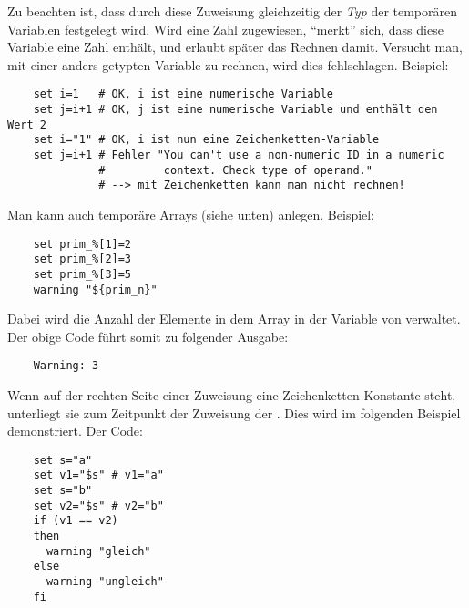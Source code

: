     Zu beachten ist, dass durch diese Zuweisung gleichzeitig der \emph{Typ} der
    temporären Variablen festgelegt wird. Wird eine Zahl zugewiesen, "`merkt"'
     sich, dass diese Variable eine Zahl enthält, und erlaubt später
    das Rechnen damit. Versucht man, mit einer anders getypten Variable zu
    rechnen, wird dies fehlschlagen. Beispiel:

\begin{example}
\begin{verbatim}
    set i=1   # OK, i ist eine numerische Variable
    set j=i+1 # OK, j ist eine numerische Variable und enthält den Wert 2
    set i="1" # OK, i ist nun eine Zeichenketten-Variable
    set j=i+1 # Fehler "You can't use a non-numeric ID in a numeric 
              #         context. Check type of operand."
              # --> mit Zeichenketten kann man nicht rechnen!
\end{verbatim}
\end{example}

    Man kann auch temporäre Arrays (siehe unten) anlegen. Beispiel:

\begin{example}
\begin{verbatim}
    set prim_%[1]=2
    set prim_%[2]=3
    set prim_%[3]=5
    warning "${prim_n}"
\end{verbatim}
\end{example}

    Dabei wird die Anzahl der Elemente in dem Array in der Variable
     von  verwaltet. Der obige Code führt somit zu
    folgender Ausgabe:

\begin{example}
\begin{verbatim}
    Warning: 3
\end{verbatim}
\end{example}

    Wenn auf der rechten Seite einer Zuweisung eine Zeichenketten-Konstante
    steht, unterliegt sie zum Zeitpunkt der Zuweisung der
    . Dies wird im
    folgenden Beispiel demonstriert. Der Code:

\begin{example}
\begin{verbatim}
    set s="a"
    set v1="$s" # v1="a"
    set s="b"
    set v2="$s" # v2="b"
    if (v1 == v2)
    then
      warning "gleich"
    else
      warning "ungleich"
    fi
\end{verbatim}
\end{example}

